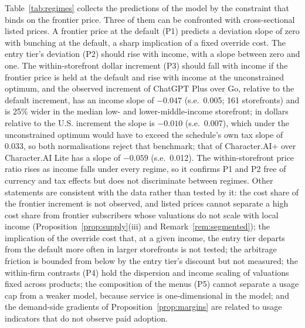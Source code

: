 \documentclass[11pt]{article}
\theoremstyle{definition}
\theoremstyle{remark}
\begin{document}
Table~\ref{tab:regimes} collects the predictions of the model by the constraint that binds on the frontier price. Three of them can be confronted with cross-sectional listed prices. A frontier price at the default (P1) predicts a deviation slope of zero with bunching at the default, a sharp implication of a fixed override cost. The entry tier's deviation (P2) should rise with income, with a slope between zero and one. The within-storefront dollar increment (P3) should fall with income if the frontier price is held at the default and rise with income at the unconstrained optimum, and the observed increment of ChatGPT Plus over Go, relative to the default increment, has an income slope of $-0.047$ (s.e.\ 0.005; 161 storefronts) and is 25\% wider in the median low- and lower-middle-income storefront; in dollars relative to the U.S. increment the slope is $-0.010$ (s.e.\ 0.007), which under the unconstrained optimum would have to exceed the schedule's own tax slope of 0.033, so both normalisations reject that benchmark; that of Character.AI+ over Character.AI Lite has a slope of $-0.059$ (s.e.\ 0.012). The within-storefront price ratio rises as income falls under every regime, so it confirms P1 and P2 free of currency and tax effects but does not discriminate between regimes. Other statements are consistent with the data rather than tested by it: the cost share of the frontier increment is not observed, and listed prices cannot separate a high cost share from frontier subscribers whose valuations do not scale with local income (Proposition~\ref{prop:supply}(iii) and Remark~\ref{rem:segmented}); the implication of the override cost that, at a given income, the entry tier departs from the default more often in larger storefronts is not tested; the arbitrage friction is bounded from below by the entry tier's discount but not measured; the within-firm contrasts (P4) hold the dispersion and income scaling of valuations fixed across products; the composition of the menus (P5) cannot separate a usage cap from a weaker model, because service is one-dimensional in the model; and the demand-side gradients of Proposition~\ref{prop:margins} are related to usage indicators that do not observe paid adoption.
\end{document}

